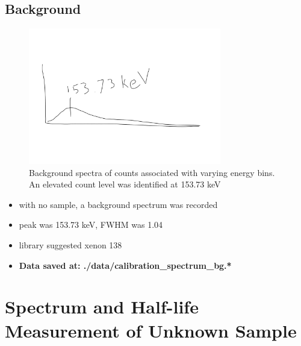 \documentclass[a4paper]{article}
\begin{document}
\subsection{Background}
\begin{figure}[H]
    \centering
    \includegraphics[width=0.75\textwidth]{figures/background_counts.pdf}
    \caption{Background spectra of counts associated with varying energy bins. An elevated count level was identified at 153.73 keV}
\end{figure}
\begin{itemize}
    \item with no sample, a background spectrum was recorded
    \item peak was 153.73 keV, FWHM was 1.04
    \item library suggested xenon 138
    \item \textbf{Data saved at: ./data/calibration\_spectrum\_bg.*}
\end{itemize}

\section{Spectrum and Half-life Measurement of Unknown Sample}
\end{document}

